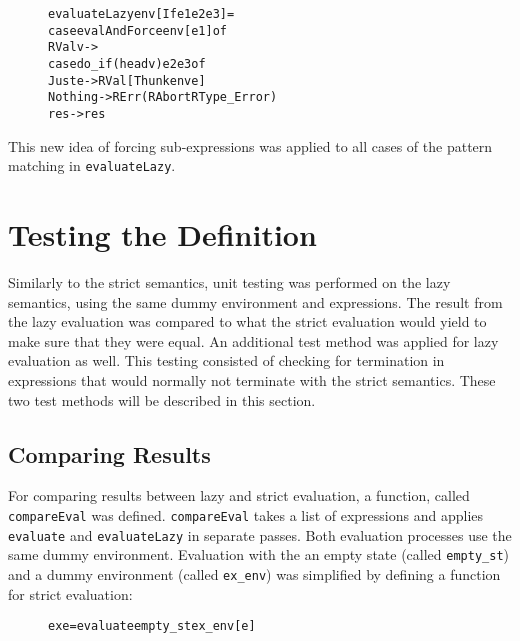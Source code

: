 \begin{figure}[H]
\begin{alltt}
  evaluateLazy env [If e1 e2 e3]   =
    case evalAndForce env [e1] of
      RVal v ->
        case do_if (head v) e2 e3 of
          Just e  -> RVal [Thunk env e]
          Nothing -> RErr (RAbort RType_Error)
      res -> res
\end{alltt}
\end{figure}

This new idea of forcing sub-expressions was applied to all cases of the
pattern matching in \texttt{evaluateLazy}.

\section{Testing the Definition}

Similarly to the strict semantics, unit testing was performed on the lazy
semantics, using the same dummy environment and expressions. 
The result from the lazy evaluation was compared to what the strict evaluation
would yield to make sure that they were equal. An additional test method was
applied for lazy evaluation as well. This testing consisted of checking for
termination in expressions that would normally not terminate with the strict
semantics. These two test methods will be described in this section.

\subsection{Comparing Results}
For comparing results between lazy and strict evaluation, a function, called
\texttt{compareEval} was defined. \texttt{compareEval} takes a list of
expressions and applies \texttt{evaluate} and \texttt{evaluateLazy}
in separate passes. Both evaluation processes use the same dummy environment.
Evaluation with the an empty state (called \texttt{empty\_st}) and
a dummy environment (called \texttt{ex\_env}) was simplified by defining a
function for strict evaluation:

\begin{figure}[H]
\begin{alltt}
  ex e = evaluate empty_st ex_env [e]
\end{alltt}
\end{figure}

